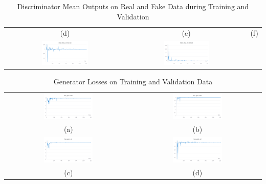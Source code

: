 \documentclass[a4paper]{article}
\begin{document}
\begin{table}[H]
\begin{tabular}{ccc}
    (d) & (e) & (f) \\
    \includegraphics[width=0.4\textwidth]{mean-disc2-on-real-val.png} &
    \includegraphics[width=0.4\textwidth]{mean-disc2-on-fake-val.png} &
  \end{tabular}
  \caption{Discriminator Mean Outputs on Real and Fake Data during Training and Validation}
  \label{tab:mean-disc-output}
\end{table}

\begin{table}[H]
  \centering
  \begin{tabular}{cc}
    \includegraphics[width=0.4\textwidth]{loss-gen1-train.png} &
    \includegraphics[width=0.4\textwidth]{loss-gen2-train.png} \\
    (a) & (b) \\
    \includegraphics[width=0.4\textwidth]{loss-gen1-val.png} &
    \includegraphics[width=0.4\textwidth]{loss-gen2-val.png} \\
    (c) & (d) \\
  \end{tabular}
  \caption{Generator Losses on Training and Validation Data}
  \label{tab:gen-losses}
\end{table}
\end{document}

